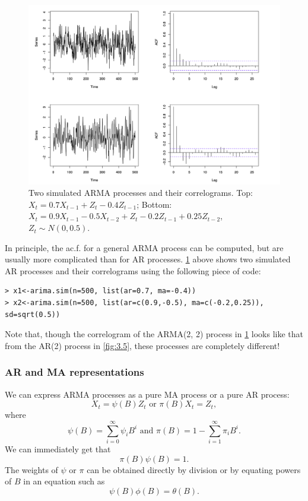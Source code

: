 \begin{figure}[ht]
	\centering
	\includegraphics[width=\textwidth]{Chapter 3/fig3-6.png}
	\caption{Two simulated ARMA processes and their correlograms. Top: $X_t = 0.7X_{t-1} + Z_t - 0.4Z_{t-1}$; 
	Bottom: $X_t = 0.9X_{t-1} - 0.5X_{t-2} + Z_t - 0.2Z_{t-1} + 0.25Z_{t-2}$, $Z_t \sim N(0, 0.5)$.}
	\label{fig:3.6}
\end{figure}

In principle, the ac.f. for a general ARMA process can be computed, but are usually more complicated than for 
AR processes. \cref{fig:3.6} above shows two simulated AR processes and their correlograms using the following 
piece of code:
\begin{verbatim}
> x1<-arima.sim(n=500, list(ar=0.7, ma=-0.4))
> x2<-arima.sim(n=500, list(ar=c(0.9,-0.5), ma=c(-0.2,0.25)), sd=sqrt(0.5))
\end{verbatim}

Note that, though the correlogram of the ARMA(2, 2) process in \cref{fig:3.6} looks like that from the AR(2) 
process in \cref{fig:3.5}, these processes are completely different!


\subsubsection{AR and MA representations}
We can express ARMA processes as a pure MA process or a pure AR process: 
\[ X_t = \psi(B)Z_t \text{ or } \pi(B) X_t = Z_t, \]
where 
\[ \psi(B) = \sum_{i = 0}^{\infty} \psi_i B^i \text{ and } \pi(B) = 1 - \sum_{i = 1}^{\infty} \pi_i B^i. \]
We can immediately get that
\[ \pi(B) \psi(B) = 1. \]
The weights of $\psi$ or $\pi$ can be obtained directly by division or by equating powers of $B$ in an equation 
such as
\[ \psi(B) \phi(B) = \theta(B). \]

